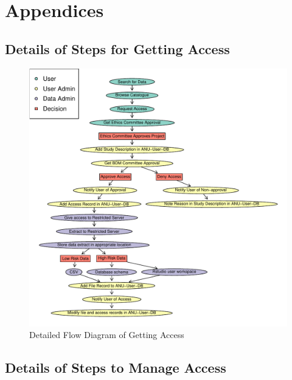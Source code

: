 \documentclass[a4paper]{article}
\begin{document}
\section{Appendices}
\label{sec-5}
\subsection{Details of Steps for Getting Access}
\label{sec-5-1}

\begin{figure}[!h]
\centering
\includegraphics[width=1.4\textwidth]{DataAccessFlowDiagram-GettingAccess.pdf}
\caption{Detailed Flow Diagram of Getting Access}
\label{fig:DataAccessFlowDiagram-GettingAccess}
\end{figure}
\clearpage
\subsection{Details of Steps to Manage Access}
\label{sec-5-2}
\end{document}
